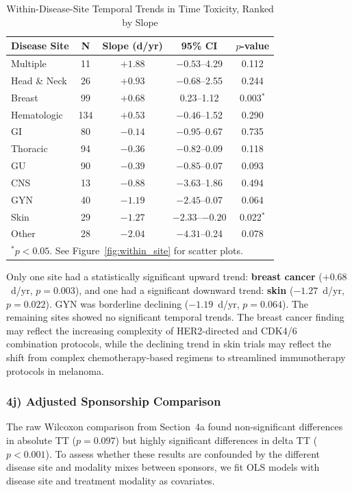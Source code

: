 \documentclass[11pt,a4paper]{article}
\begin{document}
\begin{table}[H]
\centering
\caption{Within-Disease-Site Temporal Trends in Time Toxicity, Ranked by Slope}
\label{tab:within_site}
\begin{tabular}{lcccc}
\toprule
\textbf{Disease Site} & \textbf{N} & \textbf{Slope (d/yr)} & \textbf{95\% CI} & \textbf{$p$-value} \\
\midrule
Multiple & 11 & $+1.88$ & $-0.53$--4.29 & 0.112 \\
Head \& Neck & 26 & $+0.93$ & $-0.68$--2.55 & 0.244 \\
Breast & 99 & $+0.68$ & 0.23--1.12 & 0.003$^*$ \\
Hematologic & 134 & $+0.53$ & $-0.46$--1.52 & 0.290 \\
GI & 80 & $-0.14$ & $-0.95$--0.67 & 0.735 \\
Thoracic & 94 & $-0.36$ & $-0.82$--0.09 & 0.118 \\
GU & 90 & $-0.39$ & $-0.85$--0.07 & 0.093 \\
CNS & 13 & $-0.88$ & $-3.63$--1.86 & 0.494 \\
GYN & 40 & $-1.19$ & $-2.45$--0.07 & 0.064 \\
Skin & 29 & $-1.27$ & $-2.33$--$-0.20$ & 0.022$^*$ \\
Other & 28 & $-2.04$ & $-4.31$--0.24 & 0.078 \\
\bottomrule
\multicolumn{5}{l}{\footnotesize $^*p<0.05$. See Figure~\ref{fig:within_site} for scatter plots.} \\
\end{tabular}
\end{table}

Only one site had a statistically significant upward trend: \textbf{breast cancer} ($+0.68$~d/yr, $p=0.003$), and one had a significant downward trend: \textbf{skin} ($-1.27$~d/yr, $p=0.022$). GYN was borderline declining ($-1.19$~d/yr, $p=0.064$). The remaining sites showed no significant temporal trends. The breast cancer finding may reflect the increasing complexity of HER2-directed and CDK4/6 combination protocols, while the declining trend in skin trials may reflect the shift from complex chemotherapy-based regimens to streamlined immunotherapy protocols in melanoma.

\subsubsection{4j) Adjusted Sponsorship Comparison}

The raw Wilcoxon comparison from Section~4a found non-significant differences in absolute TT ($p=0.097$) but highly significant differences in delta TT ($p<0.001$). To assess whether these results are confounded by the different disease site and modality mixes between sponsors, we fit OLS models with disease site and treatment modality as covariates.
\end{document}
